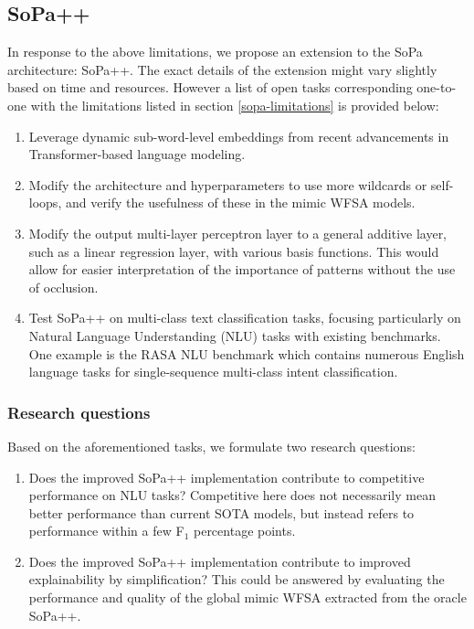 \subsection{SoPa++}

In response to the above limitations, we propose an extension to the SoPa architecture: SoPa++. The exact details of the extension might vary slightly based on time and resources. However a list of open tasks corresponding one-to-one with the limitations listed in section \ref{sopa-limitations} is provided below:

\begin{enumerate}
\item Leverage dynamic sub-word-level embeddings from recent advancements in Transformer-based language modeling.
\item Modify the architecture and hyperparameters to use more wildcards or self-loops, and verify the usefulness of these in the mimic WFSA models.
\item Modify the output multi-layer perceptron layer to a general additive layer, such as a linear regression layer, with various basis functions. This would allow for easier interpretation of the importance of patterns without the use of occlusion.
\item Test SoPa++ on multi-class text classification tasks, focusing particularly on Natural Language Understanding (NLU) tasks with existing benchmarks. One example is the RASA NLU benchmark \citep{bocklisch2017rasa} which contains numerous English language tasks for single-sequence multi-class intent classification. 
\end{enumerate}

\subsubsection{Research questions}

Based on the aforementioned tasks, we formulate two research questions:

\begin{enumerate}
\item Does the improved SoPa++ implementation contribute to competitive performance on NLU tasks? Competitive here does not necessarily mean better performance than current SOTA models, but instead refers to performance within a few F$_1$ percentage points. 
\item Does the improved SoPa++ implementation contribute to improved explainability by simplification? This could be answered by evaluating the performance and quality of the global mimic WFSA extracted from the oracle SoPa++.
\end{enumerate}


